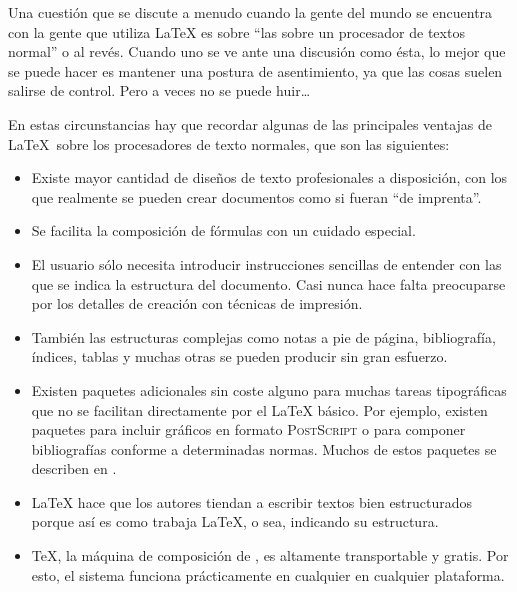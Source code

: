 Una  cuestión que  se  discute  a menudo  cuando  la  gente del  mundo
\mbox{} se encuentra con la  gente que utiliza \LaTeX{} es
sobre  ``las   sobre un  procesador de  textos
normal'' o al revés. Cuando uno se ve ante una discusión como ésta, lo
mejor que se  puede hacer es mantener una postura  de asentimiento, ya
que las  cosas suelen  salirse de  control. Pero a  veces no  se puede
huir\ldots

\medskip\noindent En estas circunstancias  hay que recordar algunas de
las principales  ventajas de \LaTeX\  sobre los procesadores  de texto
normales, que son las siguientes:

\begin{itemize}

\item  Existe  mayor cantidad  de  diseños  de texto  profesionales  a
disposición, con los que realmente  se pueden crear documentos como si
fueran ``de imprenta''.

\item Se facilita la composición de fórmulas con un cuidado especial.

\item El  usuario sólo necesita introducir  instrucciones sencillas de
entender con las que se indica la estructura del documento. Casi nunca
hace falta  preocuparse por los  detalles de creación con  técnicas de
impresión.

\item También  las estructuras complejas  como notas a pie  de página,
bibliografía, índices,  tablas y muchas  otras se pueden  producir sin
gran esfuerzo.

\item Existen paquetes adicionales sin coste alguno para muchas tareas
tipográficas que no se facilitan  directamente por el \LaTeX{} básico.
Por  ejemplo,  existen  paquetes  para  incluir  gráficos  en  formato
\mbox{\textsc{PostScript}}  o  para  componer  bibliografías  conforme
a  determinadas  normas. Muchos  de  estos  paquetes se  describen  en
\companion.

\item \LaTeX{}  hace que  los autores tiendan  a escribir  textos bien
estructurados porque así  es como trabaja \LaTeX, o  sea, indicando su
estructura.

\item  \TeX,  la  máquina  de composición  de  \LaTeXe,  es  altamente
transportable y gratis. Por esto, el sistema funciona prácticamente en
cualquier en cualquier plataforma.

\end{itemize}

